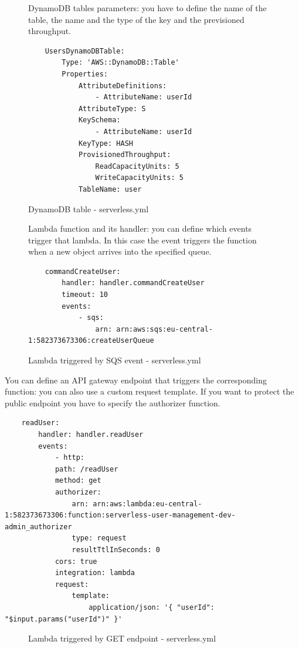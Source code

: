 \begin{figure} [H]
DynamoDB tables parameters: you have to define the name of the table, the name and the type of the key and the previsioned throughput.
\begin{lstlisting}
	UsersDynamoDBTable:
		Type: 'AWS::DynamoDB::Table'
		Properties:
			AttributeDefinitions:
				- AttributeName: userId
			AttributeType: S
			KeySchema:
				- AttributeName: userId
			KeyType: HASH
			ProvisionedThroughput:
				ReadCapacityUnits: 5
				WriteCapacityUnits: 5
			TableName: user
\end{lstlisting}
	\caption{DynamoDB table - serverless.yml}\label{}
\end{figure}
\begin{figure} [H]
 Lambda function and its handler: you can define which events trigger that lambda. In this case the event triggers the function when a new object arrives into the specified queue. 
\begin{lstlisting}
	commandCreateUser:
		handler: handler.commandCreateUser
		timeout: 10
		events:
			- sqs:
				arn: arn:aws:sqs:eu-central-1:582373673306:createUserQueue 
\end{lstlisting}
	\caption{Lambda triggered by SQS event - serverless.yml}\label{}
\end{figure}
 You can define an API gateway endpoint that triggers the corresponding function: you can also use a custom request template. If you want to protect the public endpoint you have to specify the authorizer function.
 \begin{lstlisting}
	readUser: 
		handler: handler.readUser
		events: 
			- http: 
			path: /readUser
			method: get
			authorizer: 
				arn: arn:aws:lambda:eu-central-1:582373673306:function:serverless-user-management-dev-admin_authorizer
				type: request
				resultTtlInSeconds: 0
			cors: true
			integration: lambda
			request:
				template:
					application/json: '{ "userId": "$input.params("userId")" }'
 \end{lstlisting}
\begin{figure} [H]
	\caption{Lambda triggered by GET endpoint - serverless.yml}\label{}
\end{figure}
